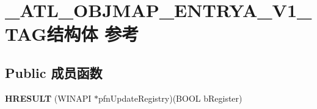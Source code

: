 \hypertarget{struct___a_t_l___o_b_j_m_a_p___e_n_t_r_y_a___v1___t_a_g}{}\section{\+\_\+\+A\+T\+L\+\_\+\+O\+B\+J\+M\+A\+P\+\_\+\+E\+N\+T\+R\+Y\+A\+\_\+\+V1\+\_\+\+T\+A\+G结构体 参考}
\label{struct___a_t_l___o_b_j_m_a_p___e_n_t_r_y_a___v1___t_a_g}
\subsection*{Public 成员函数}
\begin{DoxyCompactItemize}
\item 
\mbox{\label{struct___a_t_l___o_b_j_m_a_p___e_n_t_r_y_a___v1___t_a_g_a359dbd33e3236683942c271329ca186e}} 
{\bfseries H\+R\+E\+S\+U\+LT} (W\+I\+N\+A\+PI $\ast$pfn\+Update\+Registry)(B\+O\+OL b\+Register)
\end{DoxyCompactItemize}

